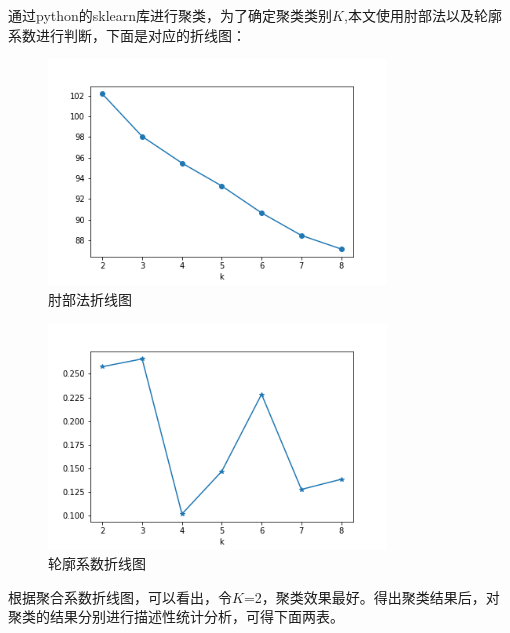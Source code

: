\documentclass[UTF8]{ctexart}
\begin{document}
通过python的sklearn库进行聚类，为了确定聚类类别$K$,本文使用肘部法以及轮廓系数进行判断，下面是对应的折线图：

\begin{figure}[H]\centering
	\includegraphics[width=0.8\textwidth,height=0.5\textwidth]{img/3/1.png} %
	\caption{肘部法折线图}
\end{figure}

\begin{figure}[H]\centering
	\includegraphics[width=0.8\textwidth,height=0.5\textwidth]{img/3/2.png} %
	\caption{轮廓系数折线图}
\end{figure}

根据聚合系数折线图，可以看出，令$K$=2，聚类效果最好。得出聚类结果后，对聚类的结果分别进行描述性统计分析，可得下面两表。
\end{document}
